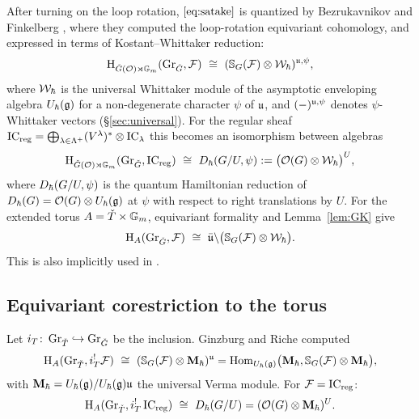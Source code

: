 \documentclass{article}
\theoremstyle{plain}
\theoremstyle{definition}
\theoremstyle{remark}
\numberwithin{equation}{section}
\begin{document}
After turning on the loop rotation, $\eqref{eq:satake}$ is quantized by
Bezrukavnikov and Finkelberg \cite{bezrukavnikov2026equivariantsatakecategorykostantwhittaker}, where they computed the loop-rotation equivariant cohomology, and expressed in terms of Kostant--Whittaker reduction:
\begin{equation}\label{eq:BF}
\H_{\GO}(\GrG,\calF)\ \cong\ (\bbS_G(\calF)\otimes\calW_\hbar)^{\fraku,\psi},
\end{equation}
where $\mathcal{W}_\hbar$ is the universal Whittaker module of the asymptotic enveloping algebra $U_\hbar(\mathfrak{g})$ for a non-degenerate character $\psi$ of $\mathfrak{u}$, and $(-)^{\mathfrak{u},\psi}$ denotes $\psi$-Whittaker vectors (\S\ref{sec:universal}). For the regular sheaf $\operatorname{IC}_{\mathrm{reg}}=\bigoplus_{\lambda\in\Lambda^+}(V^\lambda)^*\otimes\operatorname{IC}_\lambda$ this becomes an isomorphism between algebras
\begin{equation}\label{eq:BF-reg}
\H_{\GO}(\GrG,\IC_\reg)\ \cong\ \Dh(G/U,\psi):=\bigl(\calO(G)\otimes\calW_\hbar\bigr)^{U},
\end{equation}
where $D_\hbar(G/U,\psi)$ is the quantum Hamiltonian reduction of $D_\hbar(G)=\mathcal{O}(G)\otimes U_\hbar(\mathfrak{g})$ \cite[\S3.1]{ginzburg2014differentialoperatorsguaffine} at $\psi$ with respect to right translations by $U$. For the extended torus $A={\check{T}}\times\mathbb{G}_m$, equivariant formality and Lemma~\ref{lem:GK} give
\begin{equation}\label{eq:BF-torus}
\H_A(\GrG,\calF)\ \cong\ \bar\fraku\backslash\bigl(\bbS_G(\calF)\otimes\calW_\hbar\bigr).
\end{equation}
This is also implicitly used in \cite{bezrukavnikov2026equivariantsatakecategorykostantwhittaker}.

\subsection{Equivariant corestriction to the torus}\label{sec:intro-torus}
Let $i_T\colon\operatorname{Gr}_{{\check{T}}}\hookrightarrow\operatorname{Gr}_{{\check{G}}}$ be the inclusion. Ginzburg and Riche \cite[Theorem 2.2.4, Lemma 2.4.1]{ginzburg2014differentialoperatorsguaffine} computed
\begin{equation}\label{eq:GR}
\mathrm{H}_A(\operatorname{Gr}_{{\check{T}}},i_T^!\mathcal{F})\ \cong\ (\mathbb{S}_G(\mathcal{F})\otimes\mathbf{M}_\hbar)^{\mathfrak{u}}
=\operatorname{Hom}_{U_\hbar(\mathfrak{g})}\bigl(\mathbf{M}_\hbar,\mathbb{S}_G(\mathcal{F})\otimes\mathbf{M}_\hbar\bigr),
\end{equation}
with $\mathbf{M}_\hbar=U_\hbar(\mathfrak{g})/U_\hbar(\mathfrak{g})\mathfrak{u}$ the universal Verma module. For $\mathcal{F}=\operatorname{IC}_{\mathrm{reg}}$:
\begin{equation}\label{eq:GR-reg}
\mathrm{H}_A(\operatorname{Gr}_{{\check{T}}},i_T^!\operatorname{IC}_{\mathrm{reg}})\ \cong\ D_\hbar(G/U)=(\mathcal{O}(G)\otimes\mathbf{M}_\hbar)^U .
\end{equation}
\end{document}
